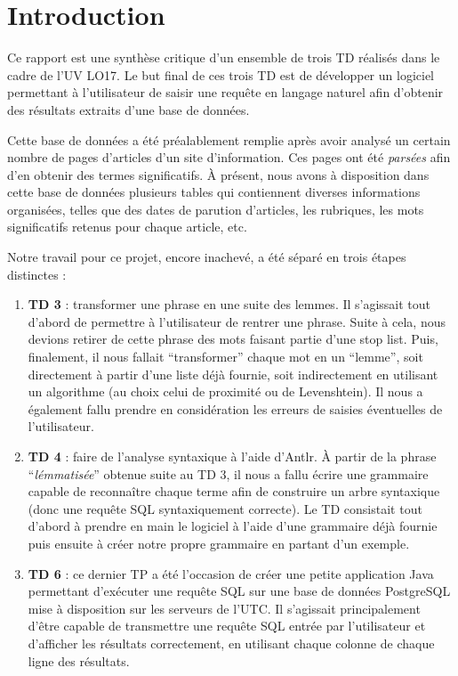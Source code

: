 \chapter{Introduction}

Ce rapport est une synthèse critique d'un ensemble de trois TD réalisés dans le cadre de l'UV LO17. Le but final de ces trois TD est de développer un logiciel permettant à l'utilisateur de saisir une requête en langage naturel afin d'obtenir des résultats extraits d'une base de données.

\medskip

Cette base de données a été préalablement remplie après avoir analysé un certain nombre de pages d'articles d'un site d'information. Ces pages ont été \textit{parsées} afin d'en obtenir des termes significatifs. À présent, nous avons à disposition dans cette base de données plusieurs tables qui contiennent diverses informations organisées, telles que des dates de parution d'articles, les rubriques, les mots significatifs retenus pour chaque article, etc.

\medskip

Notre travail pour ce projet, encore inachevé, a été séparé en trois étapes distinctes :

\begin{enumerate}
  \item \textbf{TD 3} : transformer une phrase en une suite des lemmes. Il s'agissait tout d'abord de permettre à l'utilisateur de rentrer une phrase. Suite à cela, nous devions retirer de cette phrase des mots faisant partie d'une stop list. Puis, finalement, il nous fallait ``transformer'' chaque mot en un ``lemme'', soit directement à partir d'une liste déjà fournie, soit indirectement en utilisant un algorithme (au choix celui de proximité ou de Levenshtein). Il nous a également fallu prendre en considération les erreurs de saisies éventuelles de l'utilisateur.
  \item \textbf{TD 4} : faire de l'analyse syntaxique à l'aide d'Antlr. À partir de la phrase ``\textit{lémmatisée}'' obtenue suite au TD 3, il nous a fallu écrire une grammaire capable de reconnaître chaque terme afin de construire un arbre syntaxique (donc une requête SQL syntaxiquement correcte). Le TD consistait tout d'abord à prendre en main le logiciel à l'aide d'une grammaire déjà fournie puis ensuite à créer notre propre grammaire en partant d'un exemple.
  \item \textbf{TD 6} : ce dernier TP a été l'occasion de créer une petite application Java permettant d'exécuter une requête SQL sur une base de données PostgreSQL mise à disposition sur les serveurs de l'UTC. Il s'agissait principalement d'être capable de transmettre une requête SQL entrée par l'utilisateur et d'afficher les résultats correctement, en utilisant chaque colonne de chaque ligne des résultats.
\end{enumerate}

